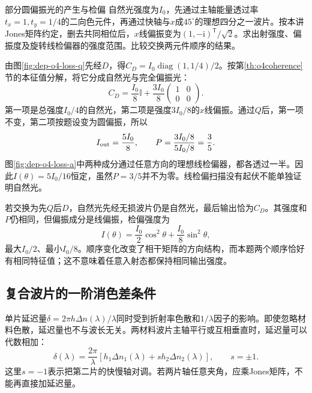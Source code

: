 \begin{example}部分圆偏振光的产生与检偏
自然光强度为$I_0$，先通过主轴能量透过率$t_x=1,t_y=1/4$的二向色元件，再通过快轴与$x$成$45^\circ$的理想四分之一波片。按本讲Jones矩阵约定，删去共同相位后，$x$线偏振变为$(1,-\mathrm i)^{\mathsf T}/\sqrt2$。求出射强度、偏振度及旋转线检偏器的强度范围。比较交换两元件顺序的结果。
\end{example}
\begin{solution}
由图\ref{fig:dep-o4-loss-q}先经$D$，得$C_D=I_0\operatorname{diag}(1,1/4)/2$。按第\ref{th:o4coherence}节的本征值分解，将它分成自然光与完全偏振光：
\[
 C_D=\frac{I_0}{8}\mathbb I+\frac{3I_0}{8}
 \begin{pmatrix}1&0\\0&0\end{pmatrix}.
\]
第一项是总强度$I_0/4$的自然光，第二项是强度$3I_0/8$的$x$线偏振。通过$Q$后，第一项不变，第二项按题设变为圆偏振，所以
\[
 I_{\rm out}=\frac{5I_0}{8},\qquad
 P=\frac{3I_0/8}{5I_0/8}=\frac35.
\]
图\ref{fig:dep-o4-loss-a}中两种成分通过任意方向的理想线检偏器，都各透过一半。因此$I(\theta)=5I_0/16$恒定，虽然$P=3/5$并不为零。线检偏扫描没有起伏不能单独证明自然光。

若交换为先$Q$后$D$，自然光先经无损波片仍是自然光，最后输出恰为$C_D$。其强度和$P$仍相同，但偏振成分是线偏振，检偏强度为
\[
 I(\theta)=\frac{I_0}{2}\cos^2\theta+\frac{I_0}{8}\sin^2\theta,
\]
最大$I_0/2$、最小$I_0/8$。顺序变化改变了相干矩阵的方向结构，而本题两个顺序恰好有相同特征值；这不意味着任意入射态都保持相同输出强度。
\end{solution}

\subsection{复合波片的一阶消色差条件}
单片延迟量$\delta=2\pi h\Delta n(\lambda)/\lambda$同时受到折射率色散和$1/\lambda$因子的影响。即使忽略材料色散，延迟量也不与波长无关。两材料波片主轴平行或互相垂直时，延迟量可以代数相加：
\[
 \delta(\lambda)=\frac{2\pi}{\lambda}
 [h_1\Delta n_1(\lambda)+s h_2\Delta n_2(\lambda)],\qquad s=\pm1.
\]
这里$s=-1$表示把第二片的快慢轴对调。若两片轴任意夹角，应乘Jones矩阵，不能再直接加延迟量。

